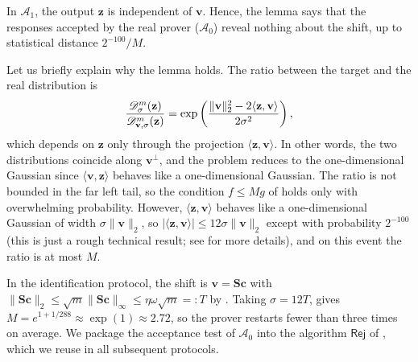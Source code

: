 \documentclass[../../book.tex]{subfiles}
\begin{document}
In $\mathcal{A}_1$, the output $\mathbf{z}$ is independent of $\mathbf{v}$.
Hence, the lemma says that the responses accepted by the real prover ($\mathcal{A}_0$) reveal nothing about the shift, up to statistical distance $2^{-100}/M$.

Let us briefly explain why the lemma holds.
The ratio between the target and the real distribution is
\begin{equation*}
    \frac{\mathscr{D}^m_{\sigma}(\mathbf{z})}{\mathscr{D}^m_{\mathbf{v},\sigma}(\mathbf{z})} = \exp\left(\frac{\|\mathbf{v}\|_2^2 - 2\langle \mathbf{z},\mathbf{v} \rangle}{2\sigma^2}\right),
\end{equation*}
which depends on $\mathbf{z}$ only through the projection $\langle \mathbf{z}, \mathbf{v} \rangle$.
In other words, the two distributions coincide along $\mathbf{v}^{\perp}$, and the problem reduces to the one-dimensional Gaussian since $\langle \mathbf{v}, \mathbf{z} \rangle$ behaves like a one-dimensional Gaussian.
The ratio is not bounded in the far left tail, so the condition $f \leq Mg$ of  holds only with overwhelming probability.
However, $\langle \mathbf{z}, \mathbf{v} \rangle$ behaves like a one-dimensional Gaussian of width $\sigma\|\mathbf{v}\|_2$, so $|\langle \mathbf{z}, \mathbf{v} \rangle| \leq 12\sigma\|\mathbf{v}\|_2$ except with probability $2^{-100}$ (this is just a rough technical result; see \cite[Lemma 4.3]{EC:Lyubashevsky12} for more details), and on this event the ratio is at most $M$.


In the identification protocol, the shift is $\mathbf{v} = \mathbf{S}\mathbf{c}$ with $\|\mathbf{S}\mathbf{c}\|_2 \leq \sqrt{m}\|\mathbf{S}\mathbf{c}\|_{\infty} \leq \eta\omega\sqrt{m} =: T$ by .
Taking $\sigma = 12T$,  gives $M = e^{1+1/288} \approx \exp(1) \approx 2.72$, so the prover restarts fewer than three times on average.
We package the acceptance test of $\mathcal{A}_0$ into the algorithm $\mathsf{Rej}$ of , which we reuse in all subsequent protocols.
\end{document}
